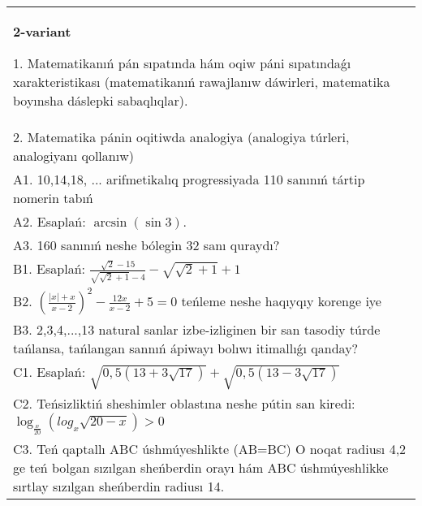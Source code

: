 \documentclass{article}
\begin{document}
\begin{tabular}{m{17cm}}
\textbf{2-variant}

1. Matematikanıń pán sıpatında hám oqiw páni sıpatındaǵı xarakteristikası (matematikanıń rawajlanıw dáwirleri, matematika boyınsha dáslepki sabaqlıqlar). \\
2. Matematika pánin oqitiwda analogiya (analogiya túrleri, analogiyanı qollanıw) \\
A1. 10,14,18, ... arifmetikalıq progressiyada 110 sanınıń tártip nomerin tabıń \\
A2. Esaplań: \(\arcsin (\sin3 ) \). \\
A3. 160 sanınıń neshe bólegin 32 sanı quraydı? \\
B1. Esaplań: \(\frac{\sqrt{2} - 15}{\sqrt{\sqrt{2} + 1} - 4} - \sqrt{\sqrt{2} + 1} + 1\) \\
B2. $(\frac{|x| + x}{x-2})^{2} - \frac{12x}{x-2} + 5 = 0$ teńleme neshe haqıyqıy korenge iye \\
B3. 2,3,4,...,13 natural sanlar izbe-izliginen bir san tasodiy túrde tańlansa, tańlangan sannıń ápiwayı bolıwı itimallıǵı qanday? \\
C1. Esaplań: \(\sqrt{0,5 (13 + 3\sqrt{17}) } + \sqrt{0,5 (13 - 3\sqrt{17}) }\) \\
C2. Teńsizliktiń sheshimler oblastına neshe pútin san kiredi:\(\log_{\frac{x}{20}} (log_{x}\sqrt{20 - x}) > 0\) \\
C3. Teń qaptallı ABC úshmúyeshlikte (AB=BC) O noqat radiusı 4,2 ge teń bolgan sızılgan sheńberdin orayı hám ABC úshmúyeshlikke sırtlay sızılgan sheńberdin radiusı 14. \\

\end{tabular}
\vspace{1cm}
\end{document}

